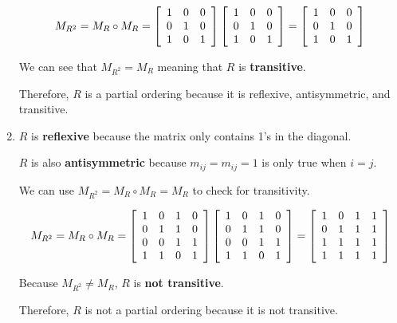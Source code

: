 \documentclass[letterpaper, 12pt]{article}
\begin{document}
\begin{enumerate}
    \[
    M_{R^2} = M_R \circ M_R =
    \left[
    \begin{array}{c c c}
         1 & 0 & 0 \\
         0 & 1 & 0 \\
         1 & 0 & 1
    \end{array}
    \right]
    \left[
    \begin{array}{c c c}
         1 & 0 & 0 \\
         0 & 1 & 0 \\
         1 & 0 & 1
    \end{array}
    \right]
    =
    \left[
    \begin{array}{c c c}
         1 & 0 & 0 \\
         0 & 1 & 0 \\
         1 & 0 & 1
    \end{array}
    \right]
    \]
    
    We can see that $M_{R^2} = M_R$ meaning that $R$ is \textbf{transitive}.
    
    Therefore, $R$ is a partial ordering because it is reflexive, antisymmetric, and transitive.
    
    \item $R$ is \textbf{reflexive} because the matrix only contains 1's in the diagonal.
    
    $R$ is also \textbf{antisymmetric} because $m_{ij} = m_{ij} = 1$ is only true when $i = j$.
    
    We can use $M_{R^2} = M_R \circ M_R = M_R$ to check for transitivity.
    
    \[
    M_{R^2} = M_R \circ M_R =
    \left[
    \begin{array}{c c c c}
         1 & 0 & 1 & 0 \\
         0 & 1 & 1 & 0 \\
         0 & 0 & 1 & 1 \\
         1 & 1 & 0 & 1
    \end{array}
    \right]
    \left[
    \begin{array}{c c c c}
         1 & 0 & 1 & 0 \\
         0 & 1 & 1 & 0 \\
         0 & 0 & 1 & 1 \\
         1 & 1 & 0 & 1
    \end{array}
    \right]
    =
    \left[
    \begin{array}{c c c c}
         1 & 0 & 1 & 1 \\
         0 & 1 & 1 & 1 \\
         1 & 1 & 1 & 1 \\
         1 & 1 & 1 & 1
    \end{array}
    \right]
    \]
    
    Because $M_{R^2} \neq M_R$, $R$ is \textbf{not transitive}.
    
    Therefore, $R$ is not a partial ordering because it is not transitive.
\end{enumerate}
\end{document}
